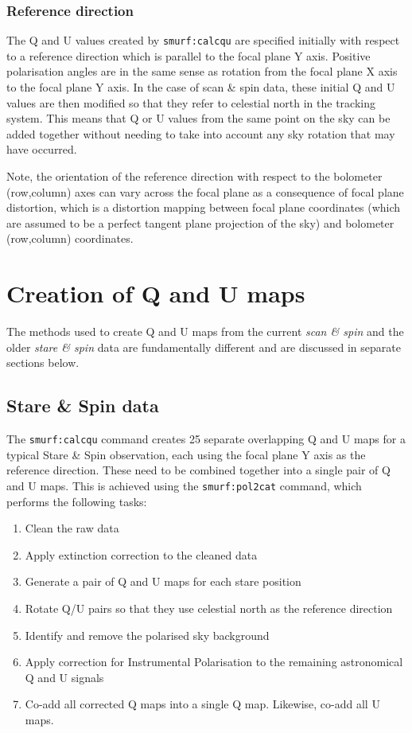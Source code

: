 \documentclass[twoside,11pt]{starlink}
\begin{document}
\subsubsection{Reference direction}
The Q and U values created by \texttt{smurf:calcqu} are specified
initially with respect to a reference direction which is parallel to the
focal plane Y axis. Positive polarisation angles are in the same sense as
rotation from the focal plane X axis to the focal plane Y axis. In the
case of scan \& spin data, these initial Q and U values are then modified so
that they refer to celestial north in the tracking system. This means
that Q or U values from the same point on the sky can be added together without
needing to take into account any sky rotation that may have occurred.

Note, the orientation of the reference direction with respect to the
bolometer (row,column) axes can vary across the focal plane as a
consequence of focal plane distortion, which is a distortion mapping
between focal plane coordinates (which are assumed to be a perfect
tangent plane projection of the sky) and bolometer (row,column)
coordinates.

\section{Creation of  Q and U maps}

The methods used to create Q and U maps from the current \emph{scan \& spin}
and the older \emph{stare \& spin} data are fundamentally different and are
discussed in separate sections below.

\subsection {Stare \& Spin data}
The \texttt{smurf:calcqu} command creates 25 separate overlapping Q and U
maps for a typical Stare \& Spin observation, each using the focal plane Y
axis as the reference direction. These need to be combined together into
a single pair of Q and U maps. This is achieved using the
\texttt{smurf:pol2cat} command, which performs the following tasks:
\begin{enumerate}
\item Clean the raw data
\item Apply extinction correction to the cleaned data
\item Generate a pair of Q and U maps for each stare position
\item Rotate Q/U pairs so that they use celestial north as the reference
direction
\item Identify and remove the polarised sky background
\item Apply correction for Instrumental Polarisation to the remaining
astronomical Q and U signals
\item Co-add all corrected Q maps into a single Q map. Likewise, co-add
all U maps.
\end{enumerate}
\end{document}
